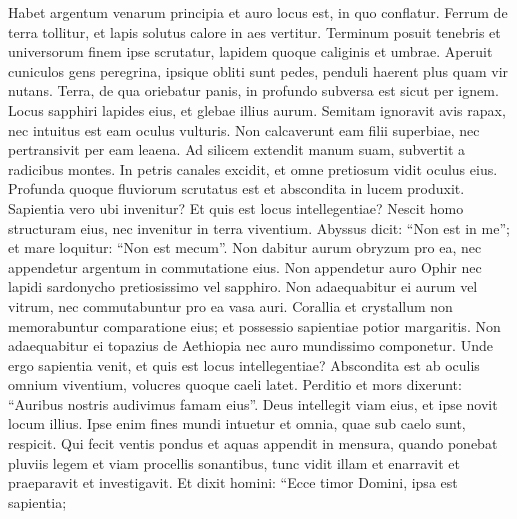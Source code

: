 \begin{biblechapter}
\begin{biblechapter}
\begin{biblechapter}
\begin{biblechapter}
\begin{biblechapter}
\begin{biblechapter}
\begin{biblechapter}
\begin{biblechapter}
\begin{biblechapter}
\begin{biblechapter}
\begin{biblechapter}
\begin{biblechapter}
\begin{biblechapter}
\begin{biblechapter}
\begin{biblechapter}
\begin{biblechapter}
\begin{biblechapter}
\begin{biblechapter}
\begin{biblechapter}
\begin{biblechapter}
\begin{biblechapter}
\begin{biblechapter}
\begin{biblechapter}
\begin{biblechapter}
\begin{biblechapter}
\begin{biblechapter}
\begin{biblechapter}
\begin{biblechapter}
\verse Habet argentum venarum principia
 et auro locus est, in quo conflatur.
 \verse Ferrum de terra tollitur,
 et lapis solutus calore in aes vertitur.
 \verse Terminum posuit tenebris
 et universorum finem ipse scrutatur,
 lapidem quoque caliginis et umbrae.
 \verse Aperuit cuniculos gens peregrina,
 ipsique obliti sunt pedes,
 penduli haerent plus quam vir nutans.
 \verse Terra, de qua oriebatur panis,
 in profundo subversa est sicut per ignem.
 \verse Locus sapphiri lapides eius,
 et glebae illius aurum.
 \verse Semitam ignoravit avis rapax,
 nec intuitus est eam oculus vulturis.
 \verse Non calcaverunt eam filii superbiae,
 nec pertransivit per eam leaena.
 \verse Ad silicem extendit manum suam,
 subvertit a radicibus montes.
 \verse In petris canales excidit,
 et omne pretiosum vidit oculus eius.
 \verse Profunda quoque fluviorum scrutatus est
 et abscondita in lucem produxit.
 \verse Sapientia vero ubi invenitur?
 Et quis est locus intellegentiae?
 \verse Nescit homo structuram eius,
 nec invenitur in terra viventium.
 \verse Abyssus dicit: “Non est in me”;
 et mare loquitur: “Non est mecum”.
 \verse Non dabitur aurum obryzum pro ea,
 nec appendetur argentum in commutatione eius.
 \verse Non appendetur auro Ophir
 nec lapidi sardonycho pretiosissimo vel sapphiro.
 \verse Non adaequabitur ei aurum vel vitrum,
 nec commutabuntur pro ea vasa auri.
 \verse Corallia et crystallum non memorabuntur comparatione eius;
 et possessio sapientiae potior margaritis.
 \verse Non adaequabitur ei topazius de Aethiopia
 nec auro mundissimo componetur.
 \verse Unde ergo sapientia venit,
 et quis est locus intellegentiae?
 \verse Abscondita est ab oculis omnium viventium,
 volucres quoque caeli latet.
 \verse Perditio et mors dixerunt:
 “Auribus nostris audivimus famam eius”.
 \verse Deus intellegit viam eius,
 et ipse novit locum illius.
 \verse Ipse enim fines mundi intuetur
 et omnia, quae sub caelo sunt, respicit.
 \verse Qui fecit ventis pondus
 et aquas appendit in mensura,
 \verse quando ponebat pluviis legem
 et viam procellis sonantibus,
 \verse tunc vidit illam et enarravit
 et praeparavit et investigavit.
 \verse Et dixit homini: “Ecce timor Domini, ipsa est sapientia;

\end{biblechapter}
\end{biblechapter}
\end{biblechapter}
\end{biblechapter}
\end{biblechapter}
\end{biblechapter}
\end{biblechapter}
\end{biblechapter}
\end{biblechapter}
\end{biblechapter}
\end{biblechapter}
\end{biblechapter}
\end{biblechapter}
\end{biblechapter}
\end{biblechapter}
\end{biblechapter}
\end{biblechapter}
\end{biblechapter}
\end{biblechapter}
\end{biblechapter}
\end{biblechapter}
\end{biblechapter}
\end{biblechapter}
\end{biblechapter}
\end{biblechapter}
\end{biblechapter}
\end{biblechapter}
\end{biblechapter}
